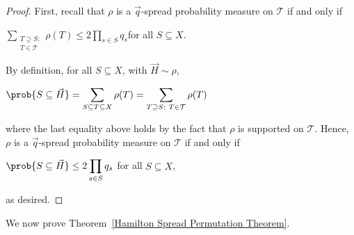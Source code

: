 \documentclass[12pt]{article}
\begin{document}
\begin{proof}
First, recall that $\rho$ is a $\vec{q}$-spread probability measure on $\mathcal{T}$ if and only if
\begin{center}
    $\displaystyle\sum\limits_{\substack{T\supseteq S:\\T\in\mathcal{T}}} \rho(T)\leq 2\displaystyle\prod\limits_{s\in S} q_s$\quad for all $S\subseteq X$.
\end{center}
By definition, for all $S\subseteq X$, with $\vec{H}\sim\rho$,
\begin{center}
    $\prob{S\subseteq\vec{H}} = \displaystyle\sum\limits_{S\subseteq T\subseteq X} \rho(T) = \displaystyle\sum\limits_{T\supseteq S:\ T\in\mathcal{T}} \rho(T)$
\end{center}
where the last equality above holds by the fact that $\rho$ is supported on $\mathcal{T}$. Hence, $\rho$ is a $\vec{q}$-spread probability measure on $\mathcal{T}$ if and only if 
\begin{center}
    $\prob{S\subseteq\vec{H}}\leq 2\displaystyle\prod\limits_{s\in S} q_s$ \quad for all $S\subseteq X$,
\end{center}
 as desired.
\end{proof}

We now prove Theorem~\ref{Hamilton Spread Permutation Theorem}.
\end{document}

